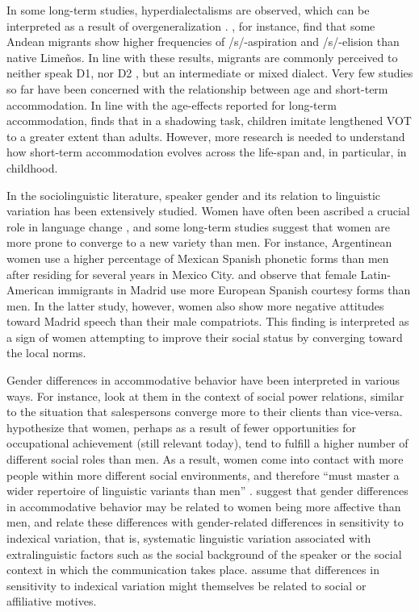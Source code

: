\documentclass[output=paper]{langscibook}
\begin{document}
In some long-term studies, hyperdialectalisms are observed, which can be interpreted as a result of overgeneralization \citep{trudgill_dialects_1986}.
\textcite{klee_andean_2006}, for instance, find that some Andean migrants show higher frequencies of /s/-aspiration and /s/-elision than native Limeños. In line with these results, migrants are commonly perceived to neither speak D1, nor D2 \citep{siegel_second_2010}, but an intermediate or mixed dialect.
Very few studies so far have been concerned with the relationship between age and short-term accommodation. In line  with the age-effects reported for long-term accommodation, \citet{nielsen_phonetic_2014} finds that in a shadowing task, children imitate lengthened VOT to a greater extent than adults. However, more research is needed to understand how short-term accommodation evolves across the life-span and, in particular, in childhood. 

In the sociolinguistic literature,  speaker gender and its relation to linguistic variation has been extensively studied. Women have often been ascribed a crucial role in language change \citep{labov_intersection_1990}, and some long-term studies suggest that women are more prone to converge to a new variety than men. For instance, Argentinean women use a higher percentage of Mexican Spanish phonetic forms than men after residing for several years in Mexico City. \citet{pesqueira_cambio_2008} and \citet{MolinaMartos2010} observe that female Latin-American immigrants in Madrid use more European Spanish courtesy forms than men. In the latter study, however, women also show more negative attitudes toward Madrid speech than their male compatriots. This finding is interpreted as a sign of women attempting to improve their social status by converging toward the local norms.

Gender differences in accommodative behavior have been interpreted in various ways. For instance, \citet[20--21]{giles_accommodation_1991} look at them in the context of social power relations, similar to the situation that salespersons converge more to their clients than vice-versa. \textcite{chambers_dialectology_1998} hypothesize that women, perhaps as a result of fewer opportunities for occupational achievement (still relevant today), tend to fulfill a higher number of different social roles than men. As a result, women come into contact with more people within more different social environments, and therefore ``must master a wider repertoire of linguistic variants than men'' \citep[85]{chambers_dialectology_1998}. \citet{willemyns_accent_1997} suggest that gender differences in accommodative behavior may be related to women being more affective than men, and \citet{namy_gender_2002} relate these differences with gender-related differences in sensitivity to indexical variation, that is, systematic linguistic variation associated with extralinguistic factors such as the social background of the speaker or the social context in which the communication takes place. \citet{namy_gender_2002}  assume that differences in sensitivity to indexical variation might themselves be related to social or affiliative motives.
\end{document}
